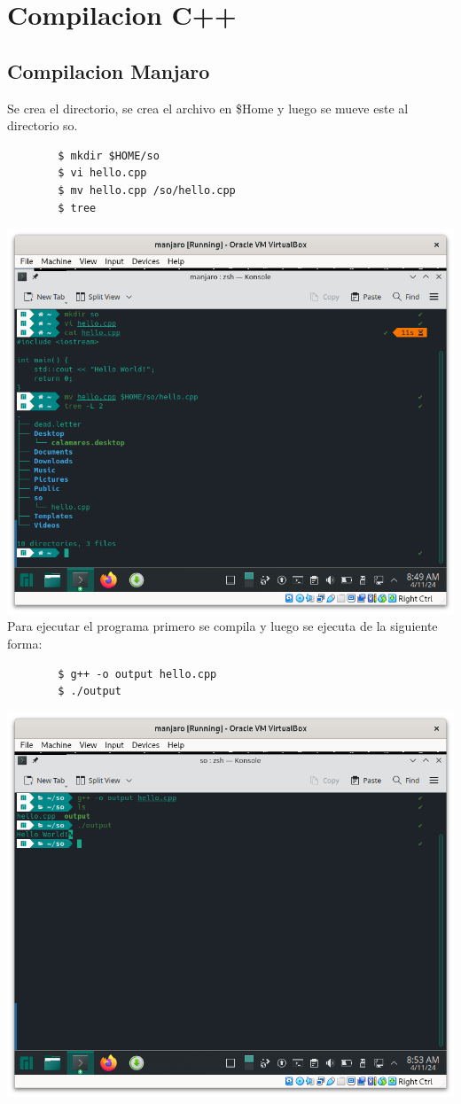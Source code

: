 \documentclass{article}
\begin{document}
\section{Compilacion C++}

   \subsection{Compilacion Manjaro}
Se crea el directorio, se crea el archivo en \$Home y luego se mueve este al directorio so.
    \begin{verbatim}
        $ mkdir $HOME/so
        $ vi hello.cpp
        $ mv hello.cpp /so/hello.cpp
        $ tree
    \end{verbatim}
\includegraphics[scale=0.5]{ejer/c++file.png}
\\
\newpage
Para ejecutar el programa primero se compila y luego se ejecuta de la siguiente forma:
    \begin{verbatim}
        $ g++ -o output hello.cpp
        $ ./output
    \end{verbatim}
\includegraphics[scale=0.5]{ejer/compilar.png}
\end{document}
